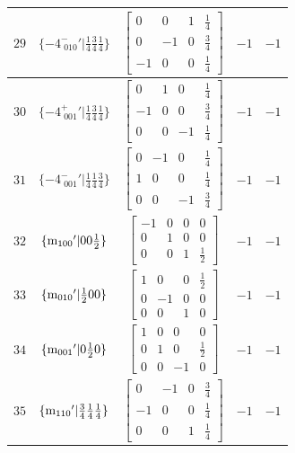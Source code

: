 \documentclass[fleqn,8pt]{jsarticle}
\begin{document}
\begin{longtable}{ccccc}
$ 29 $ & $ \{-4^{-}_{\,\,010}{}'|\frac{1}{4} \frac{3}{4} \frac{1}{4}\} $ & $ \begin{bmatrix} 0 & 0 & 1 & \frac{1}{4} \\ 0 & -1 & 0 & \frac{3}{4} \\ -1 & 0 & 0 & \frac{1}{4} \end{bmatrix} $ & $ -1 $ & $ -1 $ \\ \hline
$ 30 $ & $ \{-4^{+}_{\,\,001}{}'|\frac{1}{4} \frac{3}{4} \frac{1}{4}\} $ & $ \begin{bmatrix} 0 & 1 & 0 & \frac{1}{4} \\ -1 & 0 & 0 & \frac{3}{4} \\ 0 & 0 & -1 & \frac{1}{4} \end{bmatrix} $ & $ -1 $ & $ -1 $ \\ \hline
$ 31 $ & $ \{-4^{-}_{\,\,001}{}'|\frac{1}{4} \frac{1}{4} \frac{3}{4}\} $ & $ \begin{bmatrix} 0 & -1 & 0 & \frac{1}{4} \\ 1 & 0 & 0 & \frac{1}{4} \\ 0 & 0 & -1 & \frac{3}{4} \end{bmatrix} $ & $ -1 $ & $ -1 $ \\ \hline
$ 32 $ & $ \{{\rm m}_{100}{}'|0 0 \frac{1}{2}\} $ & $ \begin{bmatrix} -1 & 0 & 0 & 0 \\ 0 & 1 & 0 & 0 \\ 0 & 0 & 1 & \frac{1}{2} \end{bmatrix} $ & $ -1 $ & $ -1 $ \\ \hline
$ 33 $ & $ \{{\rm m}_{010}{}'|\frac{1}{2} 0 0\} $ & $ \begin{bmatrix} 1 & 0 & 0 & \frac{1}{2} \\ 0 & -1 & 0 & 0 \\ 0 & 0 & 1 & 0 \end{bmatrix} $ & $ -1 $ & $ -1 $ \\ \hline
$ 34 $ & $ \{{\rm m}_{001}{}'|0 \frac{1}{2} 0\} $ & $ \begin{bmatrix} 1 & 0 & 0 & 0 \\ 0 & 1 & 0 & \frac{1}{2} \\ 0 & 0 & -1 & 0 \end{bmatrix} $ & $ -1 $ & $ -1 $ \\ \hline
$ 35 $ & $ \{{\rm m}_{110}{}'|\frac{3}{4} \frac{1}{4} \frac{1}{4}\} $ & $ \begin{bmatrix} 0 & -1 & 0 & \frac{3}{4} \\ -1 & 0 & 0 & \frac{1}{4} \\ 0 & 0 & 1 & \frac{1}{4} \end{bmatrix} $ & $ -1 $ & $ -1 $ \\ \hline

\end{longtable}
\end{document}
